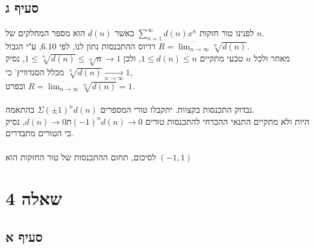 \documentclass{article}
\begin{document}
\subsection*{סעיף ג}

לפנינו טור חזקות $\sum_{n=1}^\infty d(n)x^n$ כאשר $d(n)$ הוא מספר המחלקים של $n$.\\
רדיוס ההתכנסות נתון לנו, לפי $6.10$, ע"י הגבול $R=\overline{\lim_{n\rightarrow\infty}}\sqrt[n]{d(n)}$. \\
מאחר ולכל $n$ טבעי מתקיים $1\leq d(n)\leq n$, ולכן $1\leq \sqrt[n]{d(n)}\leq \sqrt[n]{n}\rightarrow 1$, נסיק מכלל הסנדוויץ' כי $\sqrt[n]{d(n)}\xrightarrow[n\rightarrow\infty]{}1$,\\
ובפרט $R=\overline{\lim_{n\rightarrow\infty}}\sqrt[n]{d(n)}=1$. \\\\
נבדוק התכנסות בקצוות. יתקבלו טורי המספרים $\Sigma (\pm 1)^n d(n)$ בהתאמה. \\
היות ולא מתקיים התנאי ההכרחי להתכנסות טורים $d(n)\rightarrow 0ת (-1)^n d(n)\rightarrow 0$, נסיק כי הטורים מתבדרים.\\\\
לסיכום, תחום ההתכנסות של טור החזקות הוא $(-1, 1)$

\pagebreak

\section*{שאלה 4}

\subsection*{סעיף א}
\end{document}
